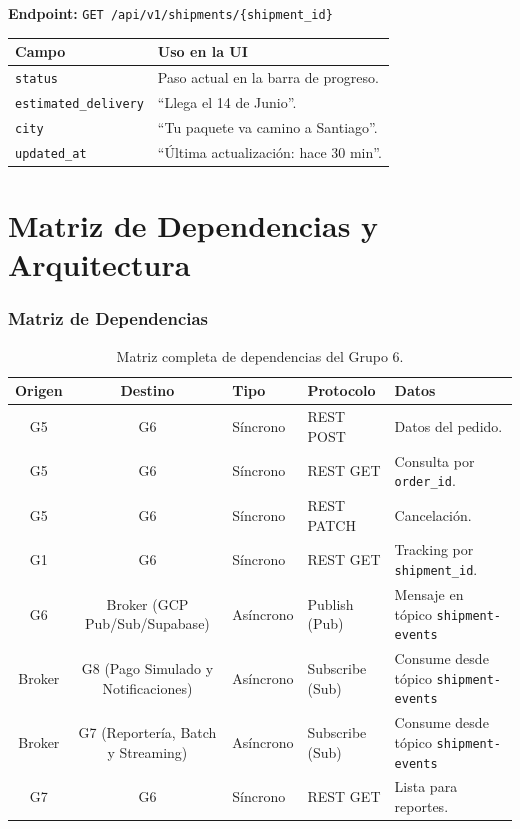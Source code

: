 \documentclass[11pt, a4paper]{article}
\begin{document}
\textbf{Endpoint:} \texttt{GET /api/v1/shipments/\{shipment\_id\}}

\begin{table}[ht!]
\centering
\renewcommand{\arraystretch}{1.4}
\begin{tabularx}{\textwidth}{l X}
  \toprule
  \textbf{Campo} & \textbf{Uso en la UI} \\
  \midrule
  \texttt{status}              & Paso actual en la barra de progreso. \\
  \texttt{estimated\_delivery} & ``Llega el 14 de Junio''. \\
  \texttt{city}                & ``Tu paquete va camino a Santiago''. \\
  \texttt{updated\_at}         & ``Última actualización: hace 30 min''. \\
  \bottomrule
\end{tabularx}
\end{table}


\newpage
\part{Matriz de Dependencias y Arquitectura}

\section{Matriz de Dependencias}

\begin{table}[ht!]
\centering
\renewcommand{\arraystretch}{1.5}
\begin{tabularx}{\textwidth}{c c l l X}
  \toprule
  \textbf{Origen} & \textbf{Destino} & \textbf{Tipo} & \textbf{Protocolo} & \textbf{Datos} \\
  \midrule
  G5  & G6  & Síncrono  & REST POST    & Datos del pedido. \\
  G5  & G6  & Síncrono  & REST GET     & Consulta por \texttt{order\_id}. \\
  G5  & G6  & Síncrono  & REST PATCH   & Cancelación. \\
  G1  & G6  & Síncrono  & REST GET     & Tracking por \texttt{shipment\_id}. \\
  G6     & Broker (GCP Pub/Sub/Supabase) & Asíncrono & Publish (Pub)   & Mensaje en tópico \texttt{shipment-events} \\
  Broker & G8 (Pago Simulado y Notificaciones)     & Asíncrono & Subscribe (Sub) & Consume desde tópico \texttt{shipment-events} \\
  Broker & G7 (Reportería, Batch y Streaming)        & Asíncrono & Subscribe (Sub) & Consume desde tópico \texttt{shipment-events} \\
  G7 & G6  & Síncrono  & REST GET     & Lista para reportes. \\
  \bottomrule
\end{tabularx}
\caption{Matriz completa de dependencias del Grupo 6.}
\end{table}
\end{document}
